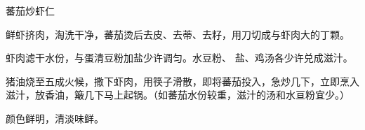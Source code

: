 \begin{recipe}{蕃茄炒虾仁}

\ingredients


\preparation

\step 鲜虾挤肉，淘洗干净，蕃茄烫后去皮、去蒂、去籽，用刀切成与虾肉大的丁颗。

\step 虾肉滤干水份，与蛋清豆粉加盐少许调匀。水豆粉、 盐、鸡汤各少许兑成滋汁。

\step 猪油烧至五成火候，撒下虾肉，用筷子滑散，即将蕃茄投入，急炒几下，立即烹入
滋汁，放香油，簸几下马上起锅。（如蕃茄水份较重，滋汁的汤和水亘粉宜少。）

\features

颜色鲜明，清淡味鲜。

\end{recipe}

